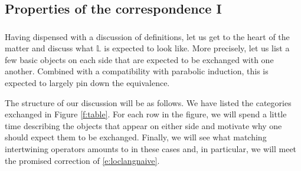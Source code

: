 \documentclass[10pt]{amsart}
\theoremstyle{remark}
\numberwithin{equation}{section}
\begin{document}
	
	\subsection{Properties of the correspondence I} 
	
	
	\subsubsection{} Having dispensed with a discussion of definitions, 
	let us 
	get to the heart of the matter and discuss what $\mathbb{L}$ is expected to 
	look like. More precisely, let us list a few basic objects on each side 
	that are expected to be exchanged with one another. Combined with a 
	compatibility with parabolic induction, this is expected to largely pin 
	down the equivalence. 
	
	
	The structure of our discussion will be as follows. We have listed the categories exchanged in Figure \ref{f:table}. For each row in the figure, we will spend a little 
	time describing the objects that appear on either side and motivate why one 
	should expect them to be 
	exchanged. Finally, we will see what matching intertwining operators 
	amounts to in these cases and, in particular, we will meet the promised 
	correction of \eqref{e:loclangnaive}. 
	
	
	
\end{document}
